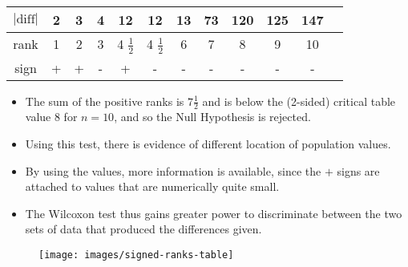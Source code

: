 \documentclass[a4paper,12pt]{article}
\begin{document}
\begin{itemize}
		\begin{center}
			\begin{tabular}{|c|c|c|c|c|c|c|c|c|c|c|c|} \hline
				$|\mbox{diff}|$ & 2 & 3 & 4 & 12 & 12 & 13 & 73 & 120 & 125 & 147\\ \hline
				rank & 1 & 2 & 3 & 4 $\frac{1}{2}$ & 4 $\frac{1}{2}$ &  6 & 7 & 8 & 9 & 10 \\ \hline
				sign & \;+\;& \;+\;&  \;- \;& \;+\;& \;-\;& \;-\;&\; -\;& \;-\;& \;-\;& \;-\;\\ \hline
			\end{tabular}
		\end{center}
		\begin{itemize}
			\item The sum of the positive ranks is $7\frac{1}{2}$ and is below the (2-sided) critical table value 8 for $n=10$,
			and so the Null Hypothesis is rejected.
			\item  Using this test, there is evidence of different location of population
			values.
			\item By using the values, more information is available, since the $+$ signs are attached to values
			that are numerically quite small. 
			\item The Wilcoxon test thus gains greater power to discriminate between
			the two sets of data that produced the differences given.
		\end{itemize}
		
	\end{itemize}
	
	\newpage
	
\begin{figure}
\texttt{[image: images/signed-ranks-table]}
\caption{}
\label{fig:signed-ranks-table}
\end{figure}
\end{document}
